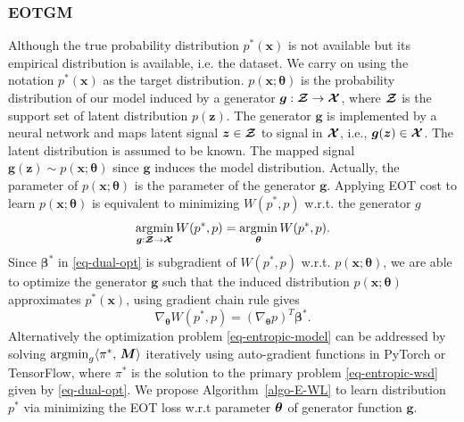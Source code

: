 \subsubsection{EOTGM}\label{subsec-gmeot}
{Although the true probability distribution $p^{\ast}(\bm{x})$ is not available but its empirical distribution is available, i.e. the dataset. We carry on using the notation $p^{\ast}(\bm{x})$ as the target distribution. $p(\bm{x};\bm{\theta})$ is the probability distribution of our model induced by a generator $\bm{g}: \bm{\mathcal{Z}} \rightarrow \bm{\mathcal{X}}$, where $\bm{\mathcal{Z}}$ is the support set of latent distribution $p(\bm{z})$. The generator $\bm{g}$ is implemented by a neural network and maps latent signal $\bm{z} \in \bm{\mathcal{Z}}$ to signal in $\bm{\mathcal{X}}$, i.e., $\bm{g}(\bm{z}) \in \bm{\mathcal{X}}$. The latent distribution is assumed to be known. The mapped signal $\bm{g}(\bm{z}) \sim p(\bm{x};\bm{\theta})$ since $\bm{g}$ induces the model distribution. Actually, the parameter of $p(\bm{x};\bm{\theta})$ is the parameter of the generator $\bm{g}$. Applying EOT cost to learn $p(\bm{x}; \bm{\theta})$ is equivalent to minimizing $W(p^{\ast}, p)$ w.r.t. the generator $g$}
\begin{equation}\label{eq-entropic-model}
  \underset{\bm{g}:\bm{\mathcal{Z}}\to \bm{\mathcal{X}}}{\operatorname{argmin}}\, W(p^{\ast}, p) = \underset{\bm{\theta}}{\operatorname{argmin}}\, W(p^{\ast}, p).
\end{equation}
Since $\bm{\beta}^{\ast}$ in \eqref{eq-dual-opt} is subgradient of $W(p^{\ast}, p)$ w.r.t. $p(\bm{x};\bm{\theta})$, we are able to
optimize the generator $\bm{g}$ such that the induced distribution $p(\bm{x};\bm{\theta})$ approximates $p^{\ast}(\bm{x})$, using gradient chain rule gives
\begin{equation}
  \nabla_{\bm{\theta}}W(p^{\ast}, p) = \left(\nabla_{\bm{\theta}}p\right)^{T} \bm{\beta}^{\ast}.
\end{equation}
Alternatively the optimization problem \eqref{eq-entropic-model} can be addressed by solving $\operatorname{argmin}_{g}\langle \pi^{\ast},\,\bm{M}\rangle $ iteratively using auto-gradient functions in PyTorch\cite{pytorch} or
TensorFlow\cite{tensorflow}, where $\pi^{\ast}$ is the solution to the primary problem \eqref{eq-entropic-wsd} given by \eqref{eq-dual-opt}. We
propose Algorithm~\ref{algo-E-WL} to learn distribution $p^{\ast}$
via minimizing the EOT loss w.r.t parameter $\bm{\theta}$ of generator function $\bm{g}$.
